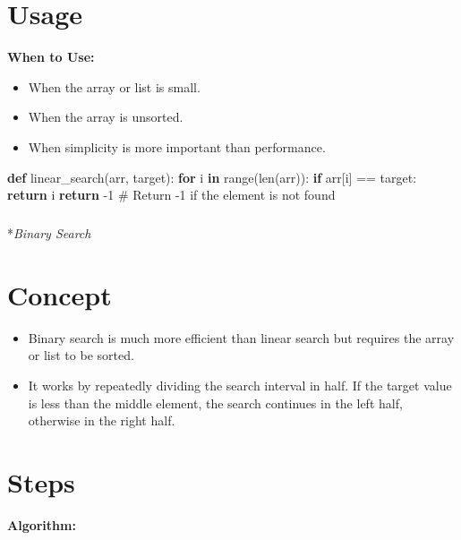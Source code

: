 \documentclass[
  letterpaper,
  DIV=11,
  numbers=noendperiod]{scrreprt}
\makeatletter
\let\oldsubparagraph\subparagraph
\renewcommand{\subparagraph}{
    \@ifstar
      \xxxSubParagraphStar
      \xxxSubParagraphNoStar
  }
\newcommand{\xxxSubParagraphStar}[1]{\oldsubparagraph*{#1}\mbox{}}
\newcommand{\xxxSubParagraphNoStar}[1]{\oldsubparagraph{#1}\mbox{}}
\newenvironment{Shaded}{\begin{snugshade}}{\end{snugshade}}
\newcommand{\BuiltInTok}[1]{\textcolor[rgb]{0.00,0.23,0.31}{#1}}
\newcommand{\CommentTok}[1]{\textcolor[rgb]{0.37,0.37,0.37}{#1}}
\newcommand{\ControlFlowTok}[1]{\textcolor[rgb]{0.00,0.23,0.31}{\textbf{#1}}}
\newcommand{\DecValTok}[1]{\textcolor[rgb]{0.68,0.00,0.00}{#1}}
\newcommand{\KeywordTok}[1]{\textcolor[rgb]{0.00,0.23,0.31}{\textbf{#1}}}
\newcommand{\NormalTok}[1]{\textcolor[rgb]{0.00,0.23,0.31}{#1}}
\newcommand{\OperatorTok}[1]{\textcolor[rgb]{0.37,0.37,0.37}{#1}}
\providecommand{\tightlist}{%
  \setlength{\itemsep}{0pt}\setlength{\parskip}{0pt}}
\makeatother
\begin{document}
\section{Usage}

\textbf{When to Use:}

\begin{itemize}
\tightlist
\item
  When the array or list is small.
\item
  When the array is unsorted.
\item
  When simplicity is more important than performance.
\end{itemize}

\begin{Shaded}
\begin{Highlighting}[]
\KeywordTok{def}\NormalTok{ linear\_search(arr, target):}
    \ControlFlowTok{for}\NormalTok{ i }\KeywordTok{in} \BuiltInTok{range}\NormalTok{(}\BuiltInTok{len}\NormalTok{(arr)):}
        \ControlFlowTok{if}\NormalTok{ arr[i] }\OperatorTok{==}\NormalTok{ target:}
            \ControlFlowTok{return}\NormalTok{ i}
    \ControlFlowTok{return} \OperatorTok{{-}}\DecValTok{1}  \CommentTok{\# Return {-}1 if the element is not found}
\end{Highlighting}
\end{Shaded}

\subparagraph*{\texorpdfstring{\emph{Binary
Search}}{Binary Search}}\label{binary-search}

\section{Concept}

\begin{itemize}
\tightlist
\item
  Binary search is much more efficient than linear search but requires
  the array or list to be sorted.
\item
  It works by repeatedly dividing the search interval in half. If the
  target value is less than the middle element, the search continues in
  the left half, otherwise in the right half.
\end{itemize}

\section{Steps}

\textbf{Algorithm:}
\end{document}
